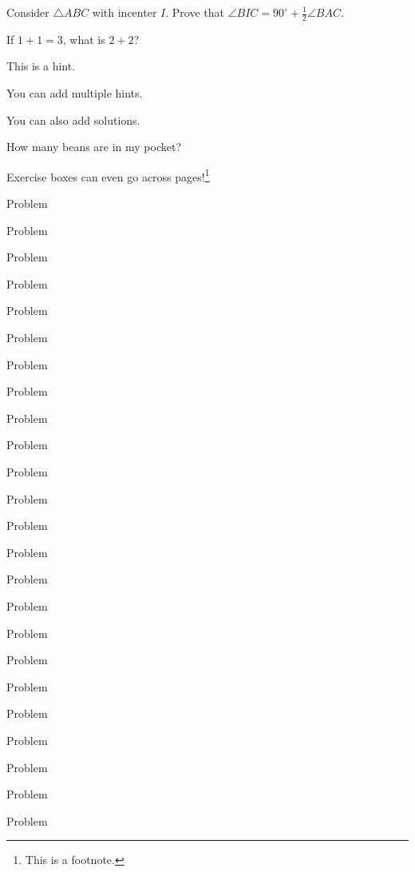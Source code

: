 \documentclass[twoside]{article}
\begin{document}
\begin{exercisebox}
\begin{exercise}
Consider $\triangle ABC$ with incenter $I.$ Prove that $\angle BIC=90^{\circ}+\frac{1}{2}\angle BAC.$
\end{exercise}
\begin{exercise}
If $1+1=3$, what is $2+2$?
\begin{hint}
\begin{addhint}
{This is a hint.}
\end{addhint}
\begin{addhint}
{You can add multiple hints.}
\end{addhint}
\end{hint}
\begin{sol}
\begin{addsol}
{You can also add solutions.}
\end{addsol}
\end{sol}
\end{exercise}
\begin{exercise}
How many beans are in my pocket?
\end{exercise}
\begin{exercise}
Exercise boxes can even go across pages!\footnote{This is a footnote.}
\end{exercise}
\end{exercisebox}

\begin{probbox}[red]
\item Problem
\item Problem
\item Problem
\item Problem
\item Problem
\item Problem
\item Problem
\item Problem
\item Problem
\item Problem
\item Problem
\item Problem
\end{probbox}

\begin{probbox}[MidnightBlue]
\item Problem
\item Problem
\item Problem
\item Problem
\item Problem
\item Problem
\item Problem
\item Problem
\item Problem
\item Problem
\item Problem
\item Problem
\end{probbox}
\end{document}
